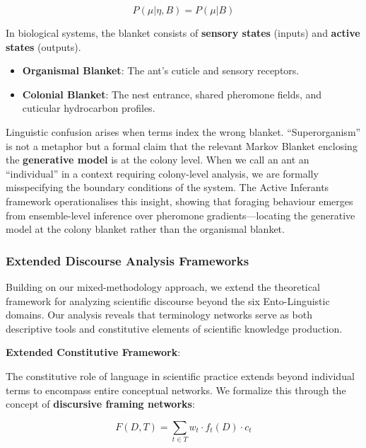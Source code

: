 \documentclass[
]{article}
\providecommand{\tightlist}{%
  \setlength{\itemsep}{0pt}\setlength{\parskip}{0pt}}
\numberwithin{equation}{section}
\begin{document}
\begin{equation}\label{eq:markov_blanket}
P(\mu | \eta, B) = P(\mu | B)
\end{equation}

In biological systems, the blanket consists of \textbf{sensory states}
(inputs) and \textbf{active states} (outputs).

\begin{itemize}
\tightlist
\item
  \textbf{Organismal Blanket}: The ant's cuticle and sensory receptors.
\item
  \textbf{Colonial Blanket}: The nest entrance, shared pheromone fields,
  and cuticular hydrocarbon profiles.
\end{itemize}

Linguistic confusion arises when terms index the wrong blanket.
``Superorganism'' is not a metaphor but a formal claim that the relevant
Markov Blanket enclosing the \textbf{generative model} is at the colony
level. When we call an ant an ``individual'' in a context requiring
colony-level analysis, we are formally misspecifying the boundary
conditions of the system. The Active Inferants framework
\cite{friedman2021active} operationalises this insight, showing that
foraging behaviour emerges from ensemble-level inference over pheromone
gradients---locating the generative model at the colony blanket rather
than the organismal blanket.

\subsubsection{Extended Discourse Analysis
Frameworks}\label{extended-discourse-analysis-frameworks}

Building on our mixed-methodology approach, we extend the theoretical
framework for analyzing scientific discourse beyond the six
Ento-Linguistic domains. Our analysis reveals that terminology networks
serve as both descriptive tools and constitutive elements of scientific
knowledge production.

\textbf{Extended Constitutive Framework}:

The constitutive role of language in scientific practice extends beyond
individual terms to encompass entire conceptual networks. We formalize
this through the concept of \textbf{discursive framing networks}:

\begin{equation}\label{eq:discursive_framing}
F(D, T) = \sum_{t \in T} w_t \cdot f_t(D) \cdot c_t
\end{equation}
\end{document}
